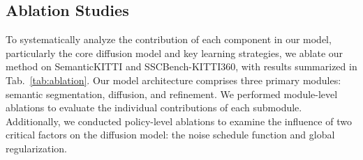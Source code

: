 \documentclass[conference]{IEEEtran}
\begin{document}
\subsection{Ablation Studies}

To systematically analyze the contribution of each component in our model, particularly the core diffusion model and key learning strategies, we ablate our method on SemanticKITTI and SSCBench-KITTI360, with results summarized in Tab.~\ref{tab:ablation}.
Our model architecture comprises three primary modules: semantic segmentation, diffusion, and refinement.
We performed module-level ablations to evaluate the individual contributions of each submodule.
Additionally, we conducted policy-level ablations to examine the influence of two critical factors on the diffusion model: the noise schedule function and global regularization.

\begin{table}[htbp]
  \centering
  \caption{The results of ablation studies for the proposed DiffSSC. The performance is evaluated on SemanticKITTI and SSCBench-KITTI360 validation sets. Best results are highlighted.}
  \label{tab:ablation}
\end{table}
\end{document}
